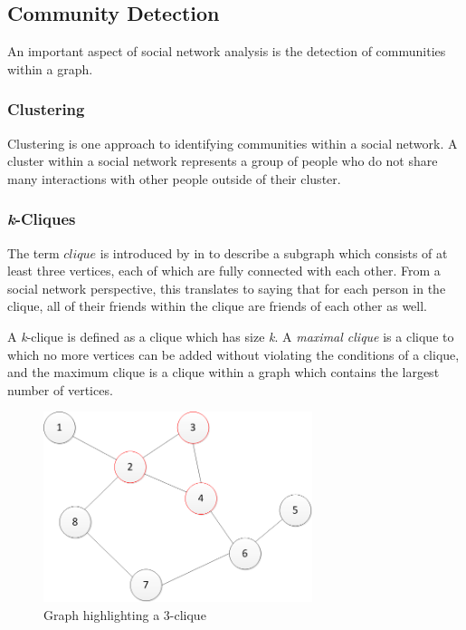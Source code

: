 \subsection{Community Detection}
An important aspect of social network analysis is the detection of communities within a graph.

\subsubsection{Clustering}
Clustering is one approach to identifying communities within a social network. A cluster within a social network represents a group of people who do not share many interactions with other people outside of their cluster.

\subsubsection{\emph{k}-Cliques}
The term $clique$ is introduced by \citeauthor{luce49} in \cite{luce49} to describe a subgraph which consists of at least three vertices, each of which are fully connected with each other. From a social network perspective, this translates to saying that for each person in the clique, all of their friends  within the clique are friends of each other as well.

A \emph{k}-clique is defined as a clique which has size \emph{k}. A \emph{maximal clique} is a clique to which no more vertices can be added without violating the conditions of a clique, and the maximum clique is a clique within a graph which contains the largest number of vertices.

\begin{figure}[htbp]
\centering
\includegraphics[width=0.7\textwidth]{./img/clique.png}
\caption{Graph highlighting a 3-clique}
\label{fig:clique}
\end{figure}

